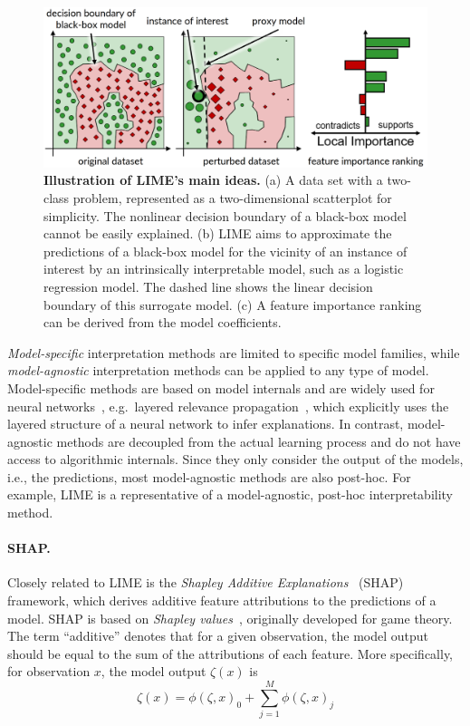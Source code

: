 \documentclass[
  oneside]{book}
\begin{document}
\begin{figure}[htbp]

{\centering \includegraphics[width=1\linewidth]{figures/09-lime} 

}

\caption{\textbf{Illustration of LIME's main ideas.} (a) A data set with a two-class problem, represented as a two-dimensional scatterplot for simplicity. The nonlinear decision boundary of a black-box model cannot be easily explained. (b) LIME aims to approximate the predictions of a black-box model for the vicinity of an instance of interest by an intrinsically interpretable model, such as a logistic regression model. The dashed line shows the linear decision boundary of this surrogate model. (c) A feature importance ranking can be derived from the model coefficients.}\label{fig:09-lime}
\end{figure}

\emph{Model-specific} interpretation methods are limited to specific model families, while \emph{model-agnostic} interpretation methods can be applied to any type of model.
Model-specific methods are based on model internals and are widely used for neural networks~\autocite{samek2020toward}, e.g.~layered relevance propagation~\autocite{bach2015pixel}, which explicitly uses the layered structure of a neural network to infer explanations.
In contrast, model-agnostic methods are decoupled from the actual learning process and do not have access to algorithmic internals.
Since they only consider the output of the models, i.e., the predictions, most model-agnostic methods are also post-hoc.
For example, LIME is a representative of a model-agnostic, post-hoc interpretability method.

\paragraph*{SHAP.}

Closely related to LIME is the \emph{Shapley Additive Explanations}~\autocite{Lundberg:SHAP2017} (SHAP) framework, which derives additive feature attributions to the predictions of a model.
SHAP is based on \emph{Shapley values}~\autocite{lipovetsky2001analysis,vstrumbelj2014explaining,shapley1953value}, originally developed for game theory.
The term ``additive'' denotes that for a given observation, the model output should be equal to the sum of the attributions of each feature.
More specifically, for observation \(x\), the model output \(\zeta(x)\) is
\begin{equation}
\zeta(x)=\phi(\zeta,x)_0 + \sum_{j=1}^M \phi(\zeta,x)_j
\label{eq:shap-additivity}
\end{equation}
\end{document}
